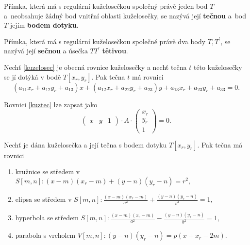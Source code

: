 \begin{definition}
    Přímka, která má s regulární kuželosečkou společný právě jeden bod $T$ a~neobsahuje
    žádný bod vnitřní oblasti kuželosečky, se nazývá její \textbf{tečnou} a~bod
    $T$ jejím \textbf{bodem dotyku}.
\end{definition}

\begin{definition}
Přímka, která má s regulární kuželosečkou společné právě dva body $T,T^\prime$, se
nazývá její \textbf{sečnou} a úsečka $TT^\prime$ \textbf{tětivou}.
\end{definition}

\begin{veta}
    Nechť \ref{kuzelosec} je obecná rovnice kuželosečky a nechť tečna $t$ této
    kuželosečky se jí dotýká v bodě $T[x_r, y_r].$ Pak tečna $t$ má rovnici
    \begin{equation}\label{kuztec}
        (a_{11}x_r+a_{12}y_r+a_{13})x+(a_{12}x_r+a_{22}y_r+a_{23})y+a_{13}x_r +
        a_{23}y_r+a_{33}=0.
    \end{equation}
\end{veta}

\begin{pozn}
    Rovnici \ref{kuztec} lze zapsat jako
    $$
    \begin{pmatrix}
        x & y & 1
    \end{pmatrix}\cdot A \cdot \begin{pmatrix}
        x_r \\
        y_r \\
        1
    \end{pmatrix}=0.
    $$
\end{pozn}

\begin{veta}
    Nechť je dána kuželosečka a její tečna s bodem dotyku $T[x_r,y_r].$ Pak tečna
    má rovnici
    \begin{enumerate}[$i.$]
    \item kružnice se středem v $S[m,n]:(x-m)(x_r-m)+(y-n)(y_r-n)=r^2,$
   	\item elipsa se středem v $S[m,n]:\frac{(x-m)(x_r-m)}{a^2}+\frac{(y-n)(y_r-n)}{b^2}=1$,
   	\item hyperbola se středem $S[m,n]:\frac{(x-m)(x_r-m)}{a^2}-\frac{(y-n)(y_r-n)}{b^2}=1$,
   	\item parabola s vrcholem $V[m,n]:(y-n)(y_r-n)=p(x+x_r-2m).$
    \end{enumerate}
\end{veta}


